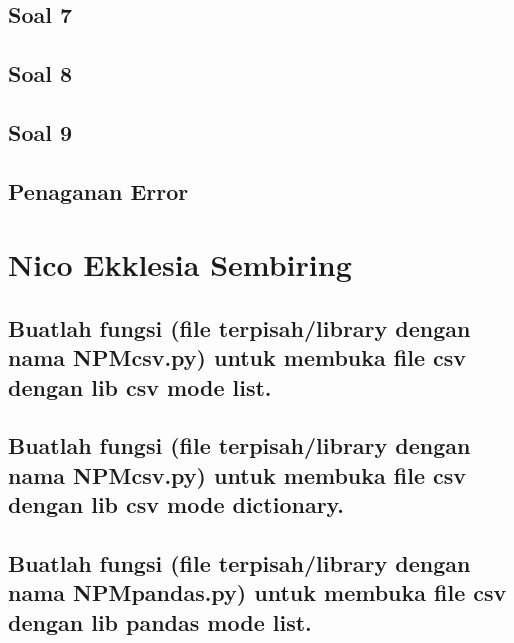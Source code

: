 \subsection{Soal 7}
	
\subsection{Soal 8}
	
\subsection{Soal 9}
	
\subsection{Penaganan Error}
	

\section{Nico Ekklesia Sembiring}
\subsection{Buatlah  fungsi  (file  terpisah/library  dengan  nama  NPMcsv.py)  untuk  membuka file csv dengan lib csv mode list.}


\subsection{Buatlah  fungsi  (file  terpisah/library  dengan  nama  NPMcsv.py)  untuk  membuka file csv dengan lib csv mode dictionary.}


\subsection{Buatlah fungsi (file terpisah/library dengan nama NPMpandas.py) untuk membuka file csv dengan lib pandas mode list.}


